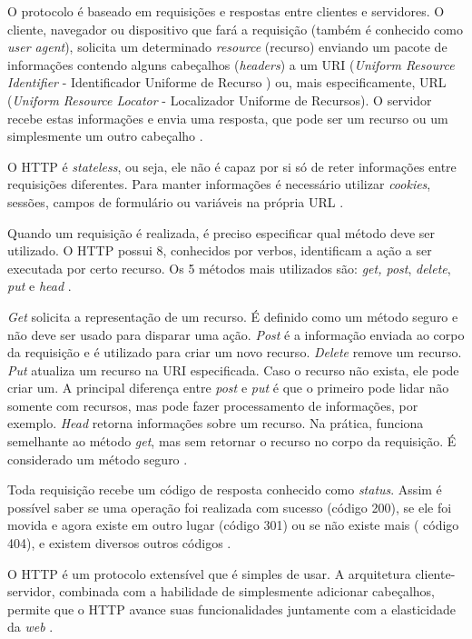  O protocolo é baseado em requisições e respostas entre clientes e servidores. O cliente, navegador ou dispositivo que fará a requisição (também é conhecido como \textit{user agent}), solicita um determinado  \textit{resource} (recurso) enviando um pacote de informações contendo alguns cabeçalhos (\textit{headers}) a um URI (\textit{Uniform Resource Identifier} - Identificador Uniforme de Recurso ) ou, mais especificamente, URL (\textit{Uniform Resource Locator} - Localizador Uniforme de Recursos). O servidor recebe estas informações e envia uma resposta, que pode ser um recurso ou um simplesmente um outro cabeçalho \cite{vieira2007}.
 
 O HTTP é\textit{ stateless}, ou seja, ele não é capaz por si só de reter informações entre requisições diferentes. Para manter informações é necessário utilizar \textit{cookies}, sessões, campos de formulário ou variáveis na própria URL \cite{vieira2007}.
 
Quando um requisição é realizada, é preciso especificar qual método deve ser utilizado. O HTTP possui 8,  conhecidos por verbos, 
identificam a ação a ser executada por certo recurso.  Os 5 métodos mais utilizados são: \textit{get, post}, \textit{delete}, \textit{put} e \textit{head} \cite{vieira2007}\cite{szigalski2018}. 

\textit{Get} solicita a representação  de um recurso. É definido como um método seguro e não deve ser usado para disparar uma ação.  \textit{Post} é a informação enviada ao corpo da requisição e é utilizado para criar um novo recurso. \textit{Delete} remove um recurso. \textit{Put} atualiza um recurso na URI especificada. Caso o recurso não exista, ele pode criar um. A principal diferença entre \textit{post} e \textit{put} é que o primeiro pode lidar não somente com recursos, mas pode fazer processamento de informações, por exemplo. \textit{Head} retorna informações sobre um recurso. Na prática, funciona semelhante ao método \textit{get}, mas sem retornar o recurso no corpo da requisição. É considerado um método seguro \cite{vieira2007}.

Toda requisição recebe um código de resposta conhecido como \textit{status}.  Assim é possível saber se uma operação foi realizada com sucesso (código 200), se ele foi movida e agora existe em outro lugar (código 301) ou se não existe mais ( código 404), e existem diversos outros códigos \cite{vieira2007}.

O HTTP é um protocolo extensível que é simples de usar. A arquitetura cliente-servidor, combinada com a habilidade de simplesmente adicionar cabeçalhos, permite que o HTTP avance suas funcionalidades juntamente com a elasticidade da \textit{web} \cite{szigalski2018}.



